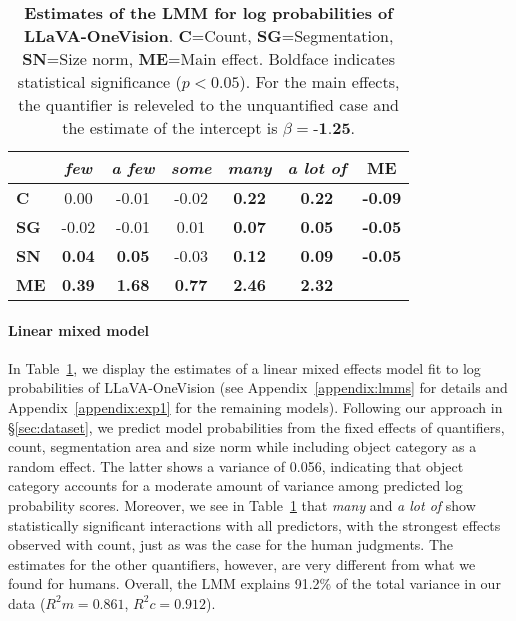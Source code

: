 \begin{table}
    \centering
    \small
    \setlength{\tabcolsep}{5pt}
    \begin{tabular}{l|ccccc|c}
    \toprule 
        & \textbf{\textit{few}} & \textbf{\textit{a few}} & \textbf{\textit{some}} & \textbf{\textit{many}} & \textbf{\textit{a lot of}} & \textbf{ME} \\\midrule
        \textbf{C}  & 0.00 & -0.01 & -0.02 & \textbf{0.22} & \textbf{0.22} & \textbf{-0.09} \\
        \textbf{SG} & -0.02 & -0.01 & 0.01 & \textbf{0.07} & \textbf{0.05} & \textbf{-0.05} \\
        \textbf{SN} & \textbf{0.04} & \textbf{0.05} & -0.03 & \textbf{0.12} & \textbf{0.09} & \textbf{-0.05} \\\midrule
        \textbf{ME} & \textbf{0.39} & \textbf{1.68} & \textbf{0.77} & \textbf{2.46} & \textbf{2.32}\\
        \bottomrule
    \end{tabular}
    \caption{\textbf{Estimates of the LMM for log probabilities of LLaVA-OneVision}. 
    \textbf{C}=Count, \textbf{SG}=Segmentation, \textbf{SN}=Size norm, \textbf{ME}=Main effect.  Boldface indicates statistical significance ($p < 0.05$). For the main effects, the quantifier is releveled to the unquantified case and the estimate of the intercept is $\beta = \textbf{-1.25}$.}
    \label{tab:lmm_llavaov}
\end{table}


\paragraph{Linear mixed model}
In Table~\ref{tab:lmm_llavaov}, we display the estimates of a linear mixed effects model fit to log probabilities of LLaVA-OneVision (see Appendix~\ref{appendix:lmms} for details and Appendix~\ref{appendix:exp1} for the remaining models). 
Following our approach in \S\ref{sec:dataset}, we predict model probabilities from the fixed effects of quantifiers, count, segmentation area and size norm while including object category as a random effect. 
The latter shows a variance of 0.056, indicating that object category accounts for a moderate amount of variance among predicted log probability scores. 
Moreover, we see in Table~\ref{tab:lmm_llavaov} that \textit{many} and \textit{a lot of} show statistically significant interactions with all predictors, with the strongest effects observed with count, just as was the case for the human judgments. The estimates for the other quantifiers, however, are very different from what we found for humans. 
Overall, the LMM explains 91.2\% of the total variance in our data ($R^2m = 0.861$, $R^2c = 0.912$).

